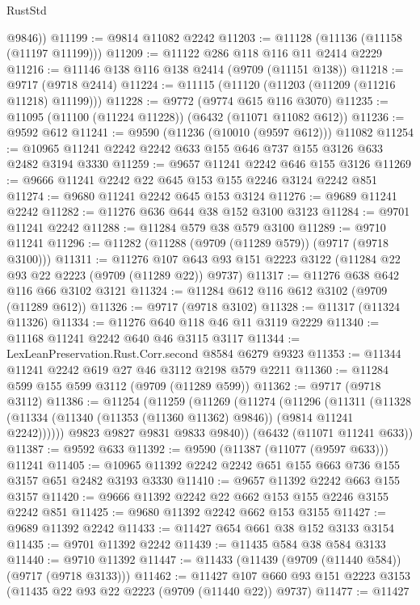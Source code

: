 \begin{lexlean}{RustStd}
\begin{coremodule}
        @9846))
@11199 := @9814 @11082 @2242
@11203 := @11128 (@11136 (@11158 (@11197 @11199)))
@11209 := @11122 @286 @118 @116 @11 @2414 @2229
@11216 := @11146 @138 @116 @138 @2414 (@9709 (@11151 @138))
@11218 := @9717 (@9718 @2414)
@11224 := @11115 (@11120 (@11203 (@11209 (@11216 @11218) @11199)))
@11228 := @9772 (@9774 @615 @116 @3070)
@11235 := @11095 (@11100 (@11224 @11228)) (@6432 (@11071 @11082 @612))
@11236 := @9592 @612
@11241 := @9590 (@11236 (@10010 (@9597 @612))) @11082
@11254 := @10965 @11241 @2242 @2242 @633 @155 @646 @737 @155 @3126 @633 @2482 @3194 @3330
@11259 := @9657 @11241 @2242 @646 @155 @3126
@11269 := @9666 @11241 @2242 @22 @645 @153 @155 @2246 @3124 @2242 @851
@11274 := @9680 @11241 @2242 @645 @153 @3124
@11276 := @9689 @11241 @2242
@11282 := @11276 @636 @644 @38 @152 @3100 @3123
@11284 := @9701 @11241 @2242
@11288 := @11284 @579 @38 @579 @3100
@11289 := @9710 @11241
@11296 := @11282 (@11288 (@9709 (@11289 @579)) (@9717 (@9718 @3100)))
@11311 := @11276
    @107
    @643
    @93
    @151
    @2223
    @3122
    (@11284 @22 @93 @22 @2223 (@9709 (@11289 @22)) @9737)
@11317 := @11276 @638 @642 @116 @66 @3102 @3121
@11324 := @11284 @612 @116 @612 @3102 (@9709 (@11289 @612))
@11326 := @9717 (@9718 @3102)
@11328 := @11317 (@11324 @11326)
@11334 := @11276 @640 @118 @46 @11 @3119 @2229
@11340 := @11168 @11241 @2242 @640 @46 @3115 @3117
@11344 := LexLeanPreservation.Rust.Corr.second @8584 @6279 @9323
@11353 := @11344 @11241 @2242 @619 @27 @46 @3112 @2198 @579 @2211
@11360 := @11284 @599 @155 @599 @3112 (@9709 (@11289 @599))
@11362 := @9717 (@9718 @3112)
@11386 := @11254
    (@11259
      (@11269
        (@11274
          (@11296
            (@11311
              (@11328 (@11334 (@11340 (@11353 (@11360 @11362) @9846)) (@9814 @11241 @2242))))))
        @9823
        @9827
        @9831
        @9833
        @9840))
    (@6432 (@11071 @11241 @633))
@11387 := @9592 @633
@11392 := @9590 (@11387 (@11077 (@9597 @633))) @11241
@11405 := @10965 @11392 @2242 @2242 @651 @155 @663 @736 @155 @3157 @651 @2482 @3193 @3330
@11410 := @9657 @11392 @2242 @663 @155 @3157
@11420 := @9666 @11392 @2242 @22 @662 @153 @155 @2246 @3155 @2242 @851
@11425 := @9680 @11392 @2242 @662 @153 @3155
@11427 := @9689 @11392 @2242
@11433 := @11427 @654 @661 @38 @152 @3133 @3154
@11435 := @9701 @11392 @2242
@11439 := @11435 @584 @38 @584 @3133
@11440 := @9710 @11392
@11447 := @11433 (@11439 (@9709 (@11440 @584)) (@9717 (@9718 @3133)))
@11462 := @11427
    @107
    @660
    @93
    @151
    @2223
    @3153
    (@11435 @22 @93 @22 @2223 (@9709 (@11440 @22)) @9737)
@11477 := @11427

\end{coremodule}
\end{lexlean}
